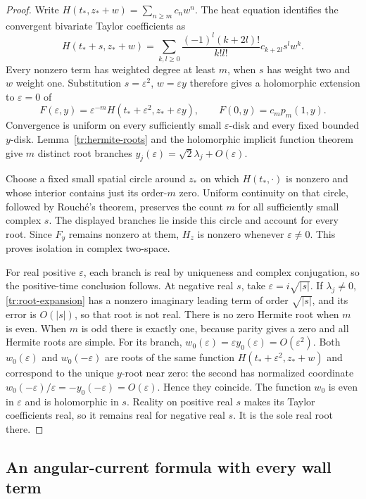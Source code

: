 \begin{proof}
Write $H(t_*,z_*+w)=\sum_{n\geq m}c_nw^n$.  The heat equation identifies
the convergent bivariate Taylor coefficients as
\[
 H(t_*+s,z_*+w)=\sum_{k,l\geq0}
       \frac{(-1)^l(k+2l)!}{k!l!}c_{k+2l}s^lw^k.
\]
Every nonzero term has weighted degree at least $m$, when $s$ has weight
two and $w$ weight one.  Substitution $s=\varepsilon^2$, $w=\varepsilon y$
therefore gives a holomorphic extension to $\varepsilon=0$ of
\[
 F(\varepsilon,y)=\varepsilon^{-m}
                  H(t_*+\varepsilon^2,z_*+\varepsilon y),
 \qquad F(0,y)=c_m p_m(1,y).
\]
Convergence is uniform on every sufficiently small $\varepsilon$-disk
and every fixed bounded $y$-disk.  Lemma~\ref{tr:hermite-roots} and the
holomorphic implicit function theorem give $m$ distinct root branches
$y_j(\varepsilon)=\sqrt2\lambda_j+O(\varepsilon)$.

Choose a fixed small spatial circle around $z_*$ on which
$H(t_*,\cdot)$ is nonzero and whose interior contains just its order-$m$
zero.  Uniform continuity on that circle, followed by Rouch\'e's theorem,
preserves the count $m$ for all sufficiently small complex $s$.
The displayed branches lie inside this circle and account for every
root.  Since $F_y$ remains nonzero at them, $H_z$ is nonzero whenever
$\varepsilon\ne0$.  This proves isolation in complex two-space.

For real positive $\varepsilon$, each branch is real by uniqueness and
complex conjugation, so the positive-time conclusion follows.  At
negative real $s$, take $\varepsilon=i\sqrt{|s|}$.  If $\lambda_j\ne0$,
\eqref{tr:root-expansion} has a nonzero imaginary leading term of order
$\sqrt{|s|}$, and its error is $O(|s|)$, so that root is not real.
There is no zero Hermite root when $m$ is even.  When $m$ is odd there
is exactly one, because parity gives a zero and all Hermite roots are
simple.  For its branch, $w_0(\varepsilon)=\varepsilon y_0(\varepsilon)
=O(\varepsilon^2)$.  Both $w_0(\varepsilon)$ and $w_0(-\varepsilon)$ are
roots of the same function $H(t_*+\varepsilon^2,z_*+w)$ and correspond
to the unique $y$-root near zero: the second has normalized coordinate
$w_0(-\varepsilon)/\varepsilon=-y_0(-\varepsilon)=O(\varepsilon)$.
Hence they coincide.  The function
$w_0$ is even in $\varepsilon$ and is holomorphic in $s$.  Reality on
positive real $s$ makes its Taylor coefficients real, so it remains
real for negative real $s$.  It is the sole real root there.
\end{proof}

\subsection{An angular-current formula with every wall term}

